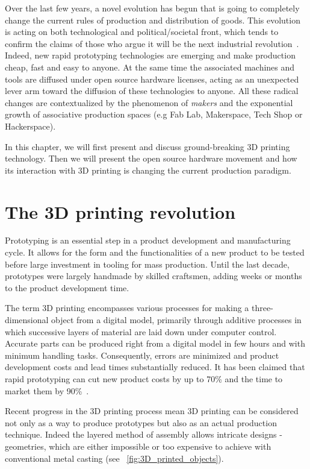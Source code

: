 Over the last few years, a novel evolution has begun that is going to completely change the current rules of production and distribution of goods. This evolution is acting on both technological and political/societal front, which tends to confirm the claims of those who argue it will be the next industrial revolution~\parencite{anderson2012makers}. Indeed, new rapid prototyping technologies are emerging and make production cheap, fast and easy to anyone. At the same time the associated machines and tools are diffused under open source hardware licenses, acting as an unexpected lever arm toward the diffusion of these technologies to anyone. All these radical changes are contextualized by the phenomenon of \emph{makers} and the exponential growth of associative production spaces (e.g Fab Lab, Makerspace, Tech Shop or Hackerspace).

In this chapter, we will first present and discuss ground-breaking 3D printing technology. Then we will present the open source hardware movement and how its interaction with 3D printing is changing the current production paradigm.


\section{The 3D printing revolution} %

Prototyping is an essential step in a product development and manufacturing cycle. It allows for the form and the functionalities of a new product to be tested before large investment in tooling for mass production. Until the last decade, prototypes were largely handmade by skilled craftsmen, adding weeks or months to the product development time.

The term 3D printing  encompasses various processes for making a three-dimensional object from a digital model, primarily through additive processes in which successive layers of material are laid down under computer control.
Accurate parts can be produced right from a digital model in few hours and with minimum handling tasks. Consequently, errors are minimized and product development costs and lead times substantially reduced. It has been claimed that rapid prototyping can cut new product costs by up to 70\% and the time to market them by 90\%~\parencite{waterman1994rapid}.

Recent progress in the 3D printing process mean 3D printing can be considered not only as a way to produce prototypes but also as an actual production technique. Indeed the layered method of assembly allows intricate designs - geometries, which are either impossible or too expensive to achieve with conventional metal casting (see \figurename~\ref{fig:3D_printed_objects}).


